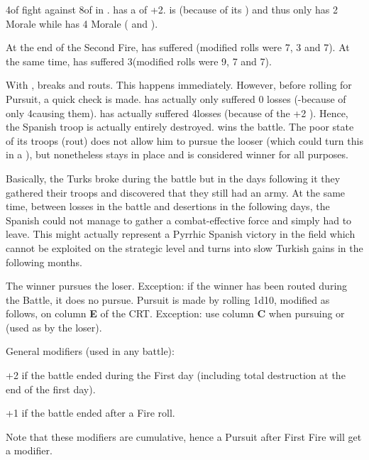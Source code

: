 \begin{exemple}[Destruction]
  4\LD of \HIS fight against 8\LD of \TUR in \TARQ. \TUR has a  of +2. \TUR is  (because of its \Timar) and
  thus only has 2 Morale while \HIS has 4 Morale ( and \TTER).

  At the end of the Second Fire, \TUR has suffered
  \texttd\textetoile\textetoile (modified \HIS rolls were 7, 3 and 7).  At the
  same time, \HIS has suffered 3\textetoile\textetoile\textetoile (modified
  \TUR rolls were 9, 7 and 7).

  With \textetoile\textetoile, \TUR breaks and routs. This happens
  immediately. However, before rolling for Pursuit, a quick check is
  made. \TUR has actually only suffered 0 losses (\texttd-\texttd because of
  only 4\LD causing them). \HIS has actually suffered 4\texttu losses (because
  of the +2 ). Hence, the Spanish troop is actually
  entirely destroyed. \TUR wins the battle. The poor state of its troops
  (rout) does not allow him to pursue the looser (which could turn this in a
  ), but \TUR nonetheless stays in place and is considered
  winner for all purposes.

  Basically, the Turks broke during the battle but in the days following it
  they gathered their troops and discovered that they still had an army. At
  the same time, between losses in the battle and desertions in the following
  days, the Spanish could not manage to gather a combat-effective force and
  simply had to leave. This might actually represent a Pyrrhic Spanish
  victory in the field which cannot be exploited on the strategic level and
  turns into slow Turkish gains in the following months.
\end{exemple}

The winner pursues the loser. Exception: if the winner has been routed during
the Battle, it does no pursue. Pursuit is made by rolling 1d10, modified as
follows, on column \textbf{E} of the CRT. Exception: use column \textbf{C}
when pursuing \NTD or \NGD (used as  by the loser).

General modifiers (used in any battle):
\begin{modlist}
\item[+2] if the battle ended during the First day (including total
  destruction at the end of the first day).
\item[+1] if the battle ended after a Fire roll.
\end{modlist}
Note that these modifiers are cumulative, hence a Pursuit after First Fire
will get a  modifier.

